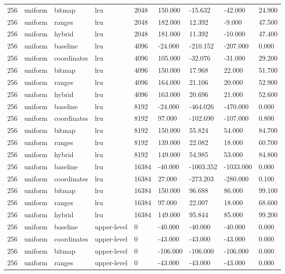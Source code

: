 \begin{tabular}{lllllllll}
256 & uniform & bitmap & lru & 2048 & 150.000 & -15.632 & -42.000 & 24.900 \\
256 & uniform & ranges & lru & 2048 & 182.000 & 12.392 & -9.000 & 47.500 \\
256 & uniform & hybrid & lru & 2048 & 181.000 & 11.392 & -10.000 & 47.400 \\
256 & uniform & baseline & lru & 4096 & -24.000 & -210.152 & -207.000 & 0.000 \\
256 & uniform & coordinates & lru & 4096 & 105.000 & -32.076 & -31.000 & 29.200 \\
256 & uniform & bitmap & lru & 4096 & 150.000 & 17.968 & 22.000 & 51.700 \\
256 & uniform & ranges & lru & 4096 & 164.000 & 21.106 & 20.000 & 52.900 \\
256 & uniform & hybrid & lru & 4096 & 163.000 & 20.696 & 21.000 & 52.600 \\
256 & uniform & baseline & lru & 8192 & -24.000 & -464.026 & -470.000 & 0.000 \\
256 & uniform & coordinates & lru & 8192 & 97.000 & -102.690 & -107.000 & 0.800 \\
256 & uniform & bitmap & lru & 8192 & 150.000 & 55.824 & 54.000 & 84.700 \\
256 & uniform & ranges & lru & 8192 & 139.000 & 22.082 & 18.000 & 60.700 \\
256 & uniform & hybrid & lru & 8192 & 149.000 & 54.985 & 53.000 & 84.800 \\
256 & uniform & baseline & lru & 16384 & -40.000 & -1003.352 & -1033.000 & 0.000 \\
256 & uniform & coordinates & lru & 16384 & 27.000 & -273.203 & -280.000 & 0.100 \\
256 & uniform & bitmap & lru & 16384 & 150.000 & 96.688 & 86.000 & 99.100 \\
256 & uniform & ranges & lru & 16384 & 97.000 & 22.007 & 18.000 & 68.600 \\
256 & uniform & hybrid & lru & 16384 & 149.000 & 95.844 & 85.000 & 99.200 \\
256 & uniform & baseline & upper-level & 0 & -40.000 & -40.000 & -40.000 & 0.000 \\
256 & uniform & coordinates & upper-level & 0 & -43.000 & -43.000 & -43.000 & 0.000 \\
256 & uniform & bitmap & upper-level & 0 & -106.000 & -106.000 & -106.000 & 0.000 \\
256 & uniform & ranges & upper-level & 0 & -43.000 & -43.000 & -43.000 & 0.000 \\

\end{tabular}
